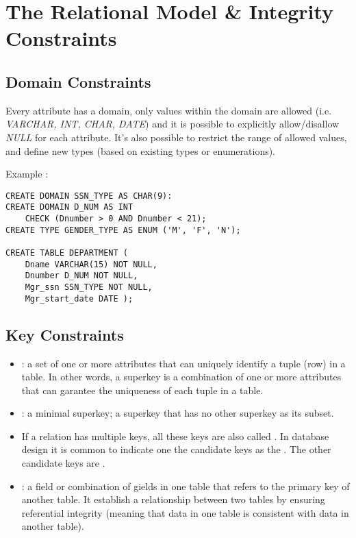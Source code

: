 \chapter{The Relational Model \& Integrity Constraints}

\section{Domain Constraints}

Every attribute has a domain, only values within the domain are allowed (i.e. \textit{VARCHAR, INT, CHAR, DATE}) and it is possible to explicitly allow/disallow \textit{NULL} for each attribute. It's also possible to restrict the range of allowed values, and define new types (based on existing types or enumerations).

Example :

\begin{verbatim}
CREATE DOMAIN SSN_TYPE AS CHAR(9):
CREATE DOMAIN D_NUM AS INT
    CHECK (Dnumber > 0 AND Dnumber < 21);
CREATE TYPE GENDER_TYPE AS ENUM ('M', 'F', 'N');

CREATE TABLE DEPARTMENT (
    Dname VARCHAR(15) NOT NULL,
    Dnumber D_NUM NOT NULL,
    Mgr_ssn SSN_TYPE NOT NULL,
    Mgr_start_date DATE );
\end{verbatim}

\section{Key Constraints}

\begin{itemize}
    \item {} : a set of one or more attributes that can uniquely identify a tuple (row) in a table. In other words, a superkey is a combination of one or more attributes that can garantee the uniqueness of each tuple in a table.
    \item {} : a minimal superkey; a superkey that has no other superkey as its subset.
    \item If a relation has multiple keys, all these keys are also called . In database design it is common to indicate one the candidate keys as the . The other candidate keys are .
    \item {} : a field or combination of gields in one table that refers to the primary key of another table. It establish a relationship between two tables by ensuring referential integrity (meaning that data in one table is consistent with data in another table).
\end{itemize}

